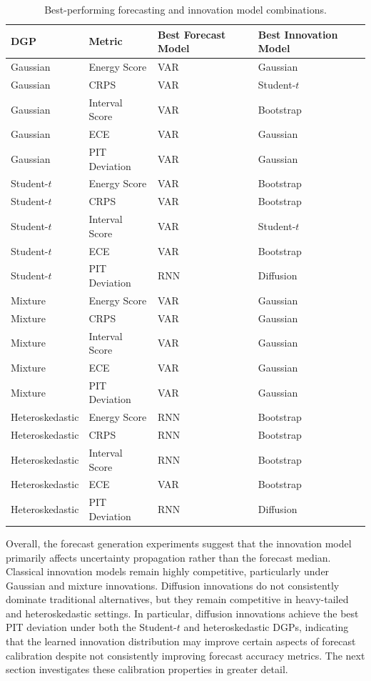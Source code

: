 \documentclass[11pt]{article}
\begin{document}
\begin{table}[H]
\centering
\caption{Best-performing forecasting and innovation model combinations.}
\label{tab:best_forecast_models}
\small
\begin{tabular}{llll}
\toprule
DGP & Metric & Best Forecast Model & Best Innovation Model \\
\midrule
Gaussian & Energy Score & VAR & Gaussian \\
Gaussian & CRPS & VAR & Student-$t$ \\
Gaussian & Interval Score & VAR & Bootstrap \\
Gaussian & ECE & VAR & Gaussian \\
Gaussian & PIT Deviation & VAR & Gaussian \\
\midrule
Student-$t$ & Energy Score & VAR & Bootstrap \\
Student-$t$ & CRPS & VAR & Bootstrap \\
Student-$t$ & Interval Score & VAR & Student-$t$ \\
Student-$t$ & ECE & VAR & Bootstrap \\
Student-$t$ & PIT Deviation & RNN & Diffusion \\
\midrule
Mixture & Energy Score & VAR & Gaussian \\
Mixture & CRPS & VAR & Gaussian \\
Mixture & Interval Score & VAR & Gaussian \\
Mixture & ECE & VAR & Gaussian \\
Mixture & PIT Deviation & VAR & Gaussian \\
\midrule
Heteroskedastic & Energy Score & RNN & Bootstrap \\
Heteroskedastic & CRPS & RNN & Bootstrap \\
Heteroskedastic & Interval Score & RNN & Bootstrap \\
Heteroskedastic & ECE & VAR & Bootstrap \\
Heteroskedastic & PIT Deviation & RNN & Diffusion \\
\bottomrule
\end{tabular}
\end{table}

Overall, the forecast generation experiments suggest that the innovation model primarily affects uncertainty propagation rather than the forecast median. Classical innovation models remain highly competitive, particularly under Gaussian and mixture innovations. Diffusion innovations do not consistently dominate traditional alternatives, but they remain competitive in heavy-tailed and heteroskedastic settings. In particular, diffusion innovations achieve the best PIT deviation under both the Student-$t$ and heteroskedastic DGPs, indicating that the learned innovation distribution may improve certain aspects of forecast calibration despite not consistently improving forecast accuracy metrics. The next section investigates these calibration properties in greater detail.
\end{document}
